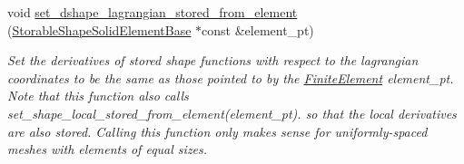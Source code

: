\begin{DoxyCompactItemize}
void \hyperlink{classoomph_1_1StorableShapeSolidElementBase_af28a213163e0b5dfb7d9597783dfec3f}{set\+\_\+dshape\+\_\+lagrangian\+\_\+stored\+\_\+from\+\_\+element} (\hyperlink{classoomph_1_1StorableShapeSolidElementBase}{Storable\+Shape\+Solid\+Element\+Base} $\ast$const \&element\+\_\+pt)
\begin{DoxyCompactList}\small\item\em Set the derivatives of stored shape functions with respect to the lagrangian coordinates to be the same as those pointed to by the \hyperlink{classoomph_1_1FiniteElement}{Finite\+Element} element\+\_\+pt. Note that this function also calls set\+\_\+shape\+\_\+local\+\_\+stored\+\_\+from\+\_\+element(element\+\_\+pt). so that the local derivatives are also stored. Calling this function only makes sense for uniformly-\/spaced meshes with elements of equal sizes. \end{DoxyCompactList}\end{DoxyCompactItemize}
